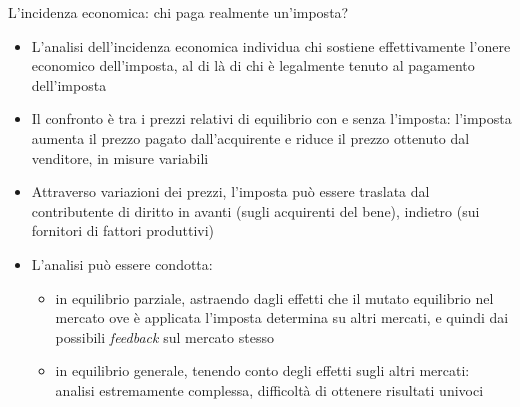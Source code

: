 \documentclass[11pt]{beamer}
\begin{document}
\begin{frame}{L'incidenza economica: chi paga realmente un'imposta?}
\begin{itemize}
\item L'analisi dell'incidenza economica individua chi sostiene effettivamente
l'onere economico dell'imposta, al di là di chi è legalmente tenuto al
pagamento dell'imposta
\item Il confronto è tra i \alert{prezzi relativi} di equilibrio con e senza l'imposta:
l'imposta aumenta il prezzo pagato dall'acquirente e riduce il prezzo
ottenuto dal venditore, in misure variabili
\item Attraverso variazioni dei prezzi, l'imposta può essere traslata dal
contributente di diritto \alert{in avanti} (sugli acquirenti del bene), \alert{indietro}
(sui fornitori di fattori produttivi)
\item L'analisi può essere condotta:
\begin{itemize}
\item in \alert{equilibrio parziale}, astraendo dagli effetti che il mutato equilibrio
nel mercato ove è applicata l'imposta determina su altri mercati, e quindi
dai possibili \emph{feedback} sul mercato stesso
\item in \alert{equilibrio generale}, tenendo conto degli effetti sugli altri mercati:
analisi estremamente complessa, difficoltà di ottenere risultati univoci
\end{itemize}
\end{itemize}
\end{frame}
\end{document}
